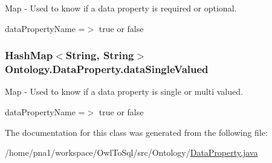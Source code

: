 Map -\/ Used to know if a data property is required or optional. 

dataPropertyName =$>$ true or false \hypertarget{class_ontology_1_1_data_property_a2de9cc72a21e027da8208f9a2df0bd56}{
\subsubsection[{dataSingleValued}]{\setlength{\rightskip}{0pt plus 5cm}HashMap$<$String, String$>$ {\bf Ontology.DataProperty.dataSingleValued}}}
\label{class_ontology_1_1_data_property_a2de9cc72a21e027da8208f9a2df0bd56}


Map -\/ Used to know if a data property is single or multi valued. 

dataPropertyName =$>$ true or false 

The documentation for this class was generated from the following file:\begin{DoxyCompactItemize}
\item 
/home/pna1/workspace/OwlToSql/src/Ontology/\hyperlink{_data_property_8java}{DataProperty.java}\end{DoxyCompactItemize}
